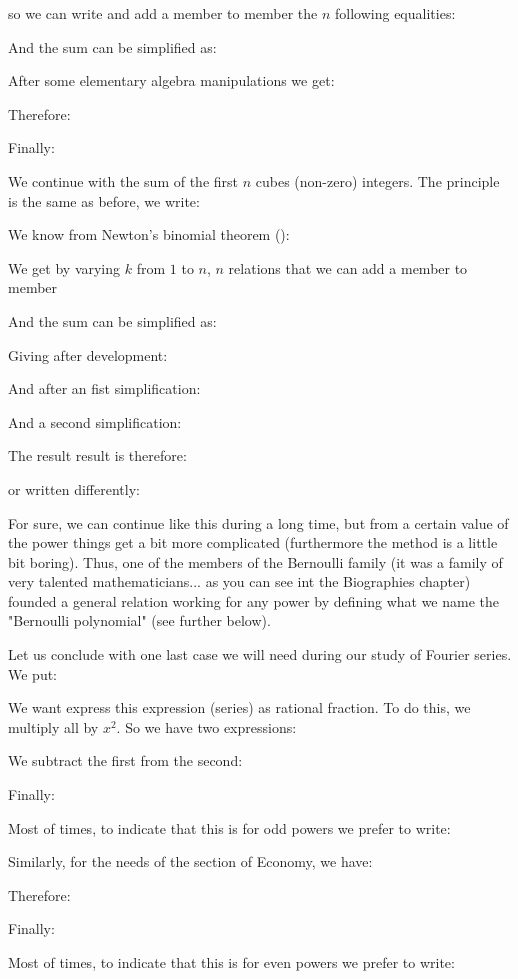 	so we can write and add a member to member the $n$ following equalities:
	
	And the sum can be simplified as:
	
	After some elementary algebra manipulations we get:
	
	Therefore:
	
	Finally:
	
	We continue with the sum of the first $n$ cubes (non-zero) integers. The principle is the same as before, we write:
	
	We know from Newton's binomial theorem ():
	
	We get by varying $k$ from $1$ to $n$, $n$ relations that we can add a member to member
	
	And the sum can be simplified as:
	
	Giving after development:
	
	And after an fist simplification:
	
	And a second simplification:
	
	The result result is therefore:
	
	or written differently:
	
	For sure, we can continue like this during a long time, but from a certain value of the power things get a bit more complicated (furthermore the method is a little bit boring). Thus, one of the members of the Bernoulli family (it was a family of very talented mathematicians... as you can see int the Biographies chapter) founded a general relation working for any power by defining what we name the "Bernoulli polynomial" (see further below).
	
	Let us conclude with one last case we will need during our study of Fourier series. We put:
	
	We want express this expression (series) as rational fraction. To do this, we multiply all by $x^2$. So we have two expressions:
	
	We subtract the first from the second:
	
	Finally:
	
	Most of times, to indicate that this is for odd powers we prefer to write:
	
	Similarly, for the needs of the section of Economy, we have:
	
	Therefore:
	
	Finally:
	
	Most of times, to indicate that this is for even powers we prefer to write:
	
